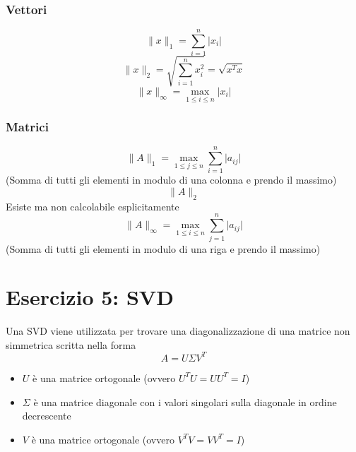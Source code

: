 \documentclass[10pt]{article}
\begin{document}
\subsubsection{Vettori}
\begin{equation*}
    \lVert x \rVert_{1} = \sum_{i=1}^{n}\lvert x_{i} \rvert
\end{equation*}
\begin{equation*}
    \lVert x \rVert_{2} = \sqrt{\sum_{i=1}^{n}x_{i}^{2}} = \sqrt{x^{T}x}
\end{equation*}
\begin{equation*}
    \lVert x \rVert_{\infty} = \max_{1\leq i\leq n}\lvert x_{i} \rvert
\end{equation*}
\subsubsection{Matrici}
\begin{equation*}
    \lVert A \rVert_{1} = \max_{1\leq j\leq n}\sum_{i=1}^{n}\lvert a_{ij} \rvert
\end{equation*} (Somma di tutti gli elementi in modulo di una colonna e prendo il massimo)
\begin{equation*}
    \lVert A \rVert_{2}
\end{equation*} Esiste ma non calcolabile esplicitamente
\begin{equation*}
    \lVert A \rVert_{\infty} = \max_{1\leq i\leq n}\sum_{j=1}^{n}\lvert a_{ij} \rvert
\end{equation*} (Somma di tutti gli elementi in modulo di una riga e prendo il massimo)
\section{Esercizio 5: SVD}
Una SVD viene utilizzata per trovare una diagonalizzazione di una matrice non simmetrica scritta nella forma \begin{equation*}
    A = U\Sigma V^{T}
\end{equation*}
\begin{itemize}
    \item $U$ è una matrice ortogonale (ovvero $U^{T}U=UU^{T}=I$)
    \item $\Sigma$ è una matrice diagonale con i valori singolari sulla diagonale in ordine decrescente
    \item $V$ è una matrice ortogonale (ovvero $V^{T}V=VV^{T}=I$)
\end{itemize}
\end{document}
